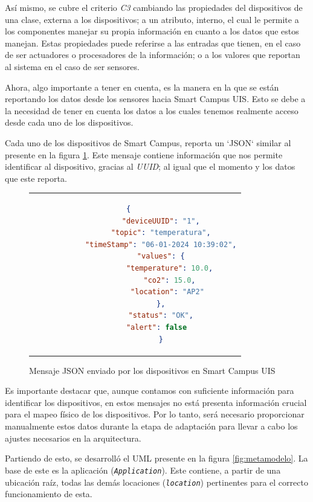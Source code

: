 Así mismo, se cubre el criterio \textit{C3} cambiando las propiedades del dispositivos de una clase, externa a los dispositivos; a un atributo, interno, el cual le permite a los componentes manejar su propia información en cuanto a los datos que estos manejan. Estas propiedades puede referirse a las entradas que tienen, en el caso de ser actuadores o procesadores de la información; o a los valores que reportan al sistema en el caso de ser sensores.

Ahora, algo importante a tener en cuenta, es la manera en la que se están reportando los datos desde los sensores hacia Smart Campus UIS. Esto se debe a la necesidad de tener en cuenta los datos a los cuales tenemos realmente acceso desde cada uno de los dispositivos.

Cada uno de los dispositivos de Smart Campus, reporta un `JSON` similar al presente en la figura \ref{fig:jsonSCU}. Este mensaje contiene información que nos permite identificar al dispositivo, gracias al \textit{UUID}; al igual que el momento y los datos que este reporta.

\begin{figure}[H]
    \centering
    \caption{Mensaje JSON enviado por los dispositivos en Smart Campus UIS }
    \cite{SmartCampusGithub}
    \label{fig:jsonSCU}
    \begin{tabular}{c}
        \setstretch{1}
        \small
        \begin{lstlisting}[language=Json]
            {   
            "deviceUUID": "1",
            "topic": "temperatura",
            "timeStamp": "06-01-2024 10:39:02",
            "values": {
                "temperature": 10.0,
                "co2": 15.0,
                "location": "AP2" 
            },
            "status": "OK",
            "alert": false  
            }
        \end{lstlisting}
    \end{tabular}
\end{figure}

Es importante destacar que, aunque contamos con suficiente información para identificar los dispositivos, en estos mensajes no está presenta información crucial para el mapeo físico de los dispositivos. Por lo tanto, será necesario proporcionar manualmente estos datos durante la etapa de adaptación para llevar a cabo los ajustes necesarios en la arquitectura.

Partiendo de esto, se desarrolló el UML presente en la figura \ref{fig:metamodelo}. La base de este es la aplicación (\textit{\texttt{Application}}). Este contiene, a partir de una ubicación raíz, todas las demás locaciones (\textit{\texttt{location}}) pertinentes para el correcto funcionamiento de esta.

